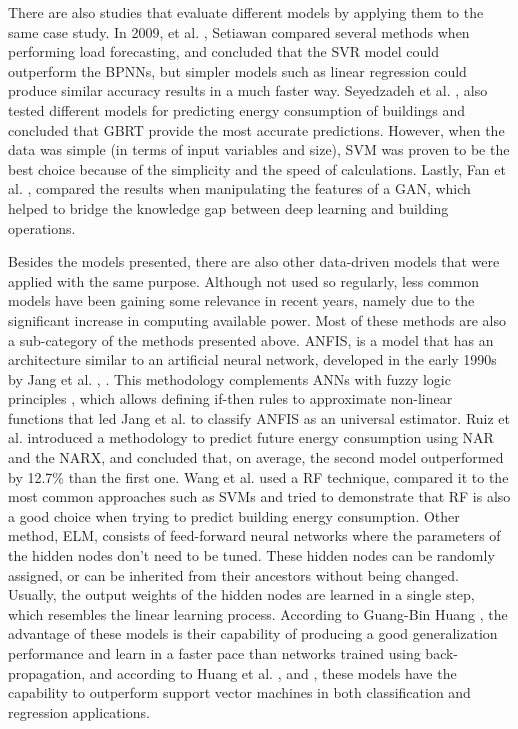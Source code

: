 There are also studies that evaluate different models by applying them to the same case study. In 2009, et al. \cite{svmr0}, Setiawan compared several methods when performing load forecasting, and concluded that the \ac{SVR} model could outperform the \ac{BPNN}s, but simpler models such as linear regression could produce similar accuracy results in a much faster way. Seyedzadeh et al. \cite{other2}, also tested different models for predicting energy consumption of buildings and concluded that \ac{GBRT} provide the most accurate predictions. However, when the data was simple (in terms of input variables and size), \ac{SVM} was proven to be the best choice because of the simplicity and the speed of calculations. Lastly, Fan et al. \cite{other1}, compared the results when manipulating the features of a \ac{GAN}, which helped to bridge the knowledge gap between deep learning and building operations. 

Besides the models presented, there are also other data-driven models that were applied with the same purpose. Although not used so regularly, less common models have been gaining some relevance in recent years, namely due to the significant increase in computing available power. Most of these methods are also a sub-category of the methods presented above. \ac{ANFIS}, is a model that has an architecture similar to an artificial neural network, developed in the early 1990s by Jang et al. \cite{anfis1}, \cite{anfis2}. This methodology complements \ac{ANN}s with fuzzy logic principles \cite{anfis3}, which allows defining if-then rules to approximate non-linear functions that led Jang et al. \cite{anfis4} to classify \ac{ANFIS} as an universal estimator. Ruiz et al. \cite{annr22} introduced a methodology to predict future energy consumption using \ac{NAR} and the \ac{NARX}, and concluded that, on average, the second model outperformed by 12.7\% than the first one. Wang et al. \cite{rf0} used a \ac{RF} technique, compared it to the most common approaches such as \ac{SVM}s and tried to demonstrate that RF is also a good choice when trying to predict building energy consumption. Other method, \ac{ELM}, consists of feed-forward neural networks where the parameters of the hidden nodes don't need to be tuned. These hidden nodes can be randomly assigned, or can be inherited from their ancestors without being changed. Usually, the output weights of the hidden nodes are learned in a single step, which resembles the linear learning process. According to Guang-Bin Huang \cite{elm1}, the advantage of these models is their capability of producing a good generalization performance and learn in a faster pace than networks trained using back-propagation, and according to Huang et al. \cite{elm2}, \cite{elm3} and \cite{elm4}, these models have the capability to outperform support vector machines in both classification and regression applications.




